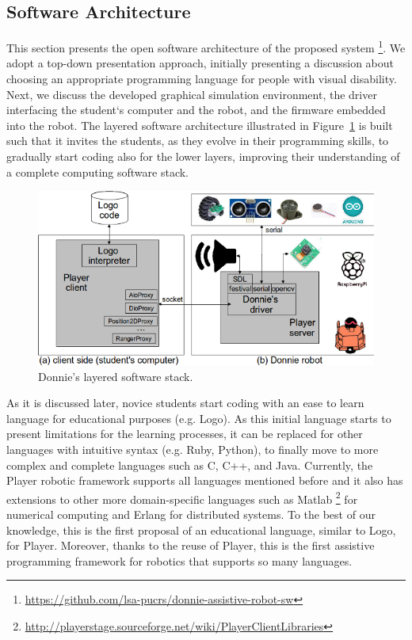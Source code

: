 \subsection{Software Architecture}
\label{sec:software}

This section presents the open software architecture of the proposed system \footnote{\url{https://github.com/lsa-pucrs/donnie-assistive-robot-sw}}. We adopt a top-down presentation approach, initially presenting a discussion about choosing an appropriate programming language for people with visual disability. Next, we discuss the developed 
graphical simulation environment, the driver interfacing the student`s computer and the robot, and the firmware embedded into the robot. 
The layered software architecture illustrated in Figure~\ref{fig:donnie-soft-layer} is built such that it invites the students, as they evolve in their programming skills, to gradually start coding also for the lower layers, improving their understanding of a complete computing software stack. 

\begin{figure}[h!]
  \centering
    \includegraphics[width=0.95\linewidth]{figs/assistive-sw.png}
  \caption{Donnie's layered software stack.}
  \label{fig:donnie-soft-layer}
\end{figure}

As it is discussed later, novice students start coding with an ease to learn language for educational purposes (e.g. Logo). As this initial language starts to present limitations for the learning processes, it can be replaced for other languages with intuitive syntax (e.g. Ruby, Python), to finally move to more complex and complete languages such as C, C++, and Java. Currently, the Player robotic framework supports all languages mentioned before and it also has extensions to other more domain-specific languages such as Matlab \footnote{\url{http://playerstage.sourceforge.net/wiki/PlayerClientLibraries}} for numerical computing and Erlang \cite{Gruner:2009} for distributed systems. To the best of our knowledge, this is the first proposal of an educational language, similar to Logo, for Player. Moreover, thanks to the reuse of Player, this is the first assistive programming framework for robotics that supports so many languages.

